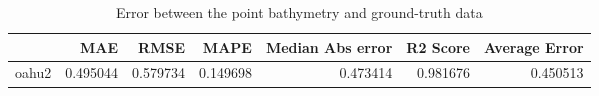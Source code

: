 \begin{table}[h!]
\caption{Error between the point bathymetry and ground-truth data}
\label{tab:oahu2_lidar_error}
\begin{tabular}{lrrrrrr}
\toprule
 & MAE & RMSE & MAPE & Median Abs error & R2 Score & Average Error \\
\midrule
oahu2 & 0.495044 & 0.579734 & 0.149698 & 0.473414 & 0.981676 & 0.450513 \\
\bottomrule
\end{tabular}
\end{table}
